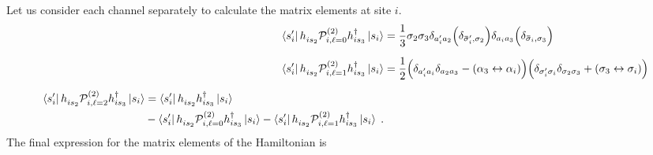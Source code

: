 Let us consider each channel separately to calculate the matrix elements at site $i$.
\begin{align}
   \bra{s_i'}    h_{is_2}^{\phantom{\dagger}} \mathcal{P}^{(2)}_{i,\ell=0}  h_{is_3}^\dagger  \ket{s_i}
    &=
    \frac{1}{3} \sigma_2\sigma_3 \delta_{a_{i}'a_{2}}
    \Big( \delta_{\bar\sigma_i', \sigma_2} \Big)
    \delta_{a_{i}a_{3}}
    \Big( \delta_{\bar\sigma_i,\sigma_3} \Big)
        \\[6pt]
\bra{s_i'}    h_{is_2}^{\phantom{\dagger}} \mathcal{P}^{(2)}_{i,\ell=1}  h_{is_3}^\dagger  \ket{s_i}
&=
\frac{1}{2}
\Big( \delta_{a_{i}'a_{i}} \delta_{a_{2}a_{3}} - (\alpha_3 \leftrightarrow \alpha_i)  \Big)
\Big( \delta_{\sigma_{i}'\sigma_{i}} \delta_{\sigma_{2}\sigma_{3}} + (\sigma_3 \leftrightarrow \sigma_i)  \Big)
\\[6pt]
    \begin{split}
      \bra{s_i'}    h_{is_2}^{\phantom{\dagger}} \mathcal{P}^{(2)}_{i,\ell=2}  h_{is_3}^\dagger  \ket{s_i}
     &=
     \bra{s_i'}    h_{is_2}^{\phantom{\dagger}}    h_{is_3}^\dagger  \ket{s_i} \\
     &
     -
     \bra{s_i'}    h_{is_2}^{\phantom{\dagger}} \mathcal{P}^{(2)}_{i,\ell=0}  h_{is_3}^\dagger  \ket{s_i}
     -
     \bra{s_i'}    h_{is_2}^{\phantom{\dagger}} \mathcal{P}^{(2)}_{i,\ell=1}  h_{is_3}^\dagger  \ket{s_i}
     \; .
    \end{split}
\end{align}
The final expression for the matrix elements of the Hamiltonian is
